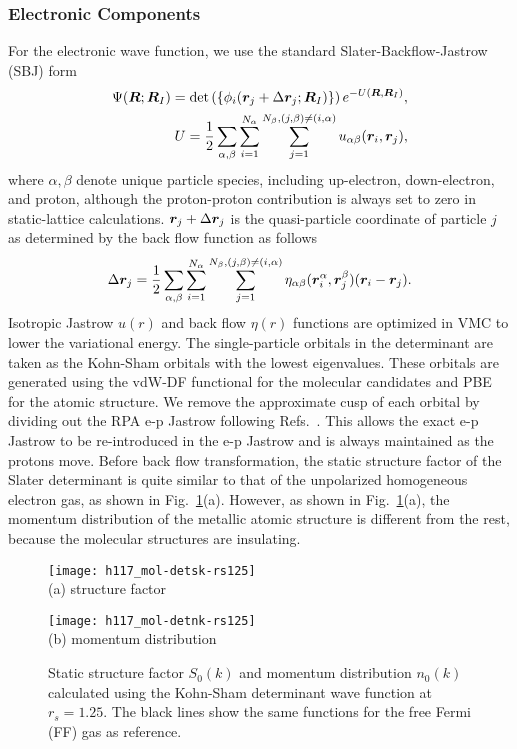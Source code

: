 \subsubsection{Electronic Components}
For the electronic wave function, we use the standard Slater-Backflow-Jastrow (SBJ) form
\begin{align}
\Psi(\boldsymbol{R};\boldsymbol{R}_I) = \det\left( \{ \phi_i(\boldsymbol{r}_j+\Delta\boldsymbol{r}_j;\boldsymbol{R}_I)\} \right) e^{-U(\boldsymbol{R},\boldsymbol{R}_I)}, \\
U = \frac{1}{2}\sum\limits_{\alpha, \beta} \sum\limits_{i=1}^{N_\alpha} \sum\limits_{j=1}^{N_\beta, (j,\beta)\neq(i,\alpha)} u_{\alpha\beta}(\boldsymbol{r}_i, \boldsymbol{r}_j), \label{eq:hsolid-ujas}
\end{align}
where $\alpha, \beta$ denote unique particle species, including up-electron, down-electron, and proton, although the proton-proton contribution is always set to zero in static-lattice calculations. $\boldsymbol{r}_j+\Delta\boldsymbol{r}_j$ is the quasi-particle coordinate of particle $j$ as determined by the back flow function as follows
\begin{align}
\Delta \boldsymbol{r}_j = \frac{1}{2}\sum\limits_{\alpha, \beta} \sum\limits_{i=1}^{N_\alpha} \sum\limits_{j=1}^{N_\beta, (j,\beta)\neq(i,\alpha)} \eta_{\alpha\beta}(\boldsymbol{r}_i^\alpha, \boldsymbol{r}_j^\beta)(\boldsymbol{r}_i-\boldsymbol{r}_j).
\label{eq:hsolid-bf}
\end{align}
Isotropic Jastrow $u(r)$ and back flow $\eta(r)$ functions are optimized in VMC to lower the variational energy.
The single-particle orbitals in the determinant are taken as the Kohn-Sham orbitals with the lowest eigenvalues.
These orbitals are generated using the vdW-DF functional for the molecular candidates and PBE for the atomic structure. We remove the approximate cusp of each orbital by dividing out the RPA e-p Jastrow following Refs.~\cite{Ceperley1987,Natoli1993,Natoli1995}.
This allows the exact e-p Jastrow to be re-introduced in the e-p Jastrow and is always maintained as the protons move.
Before back flow transformation, the static structure factor of the Slater determinant is quite similar to that of the unpolarized homogeneous electron gas, as shown in Fig.~\ref{fig:hsolid-det-sk-nk}(a). However, as shown in  Fig.~\ref{fig:hsolid-det-sk-nk}(a), the momentum distribution of the metallic atomic structure is different from the rest, because the molecular structures are insulating.

\begin{figure}[h]
\centering
\begin{minipage}{0.49\textwidth}
\centering
\texttt{[image: h117\_mol-detsk-rs125]}\\
(a) structure factor
\end{minipage}
\begin{minipage}{0.49\textwidth}
\centering
\texttt{[image: h117\_mol-detnk-rs125]}\\
(b) momentum distribution
\end{minipage}
\caption{Static structure factor $S_0(k)$ and momentum distribution $n_0(k)$ calculated using the Kohn-Sham determinant wave function at $r_s=1.25$. The black lines show the same functions for the free Fermi (FF) gas as reference.}
\label{fig:hsolid-det-sk-nk}
\end{figure}

